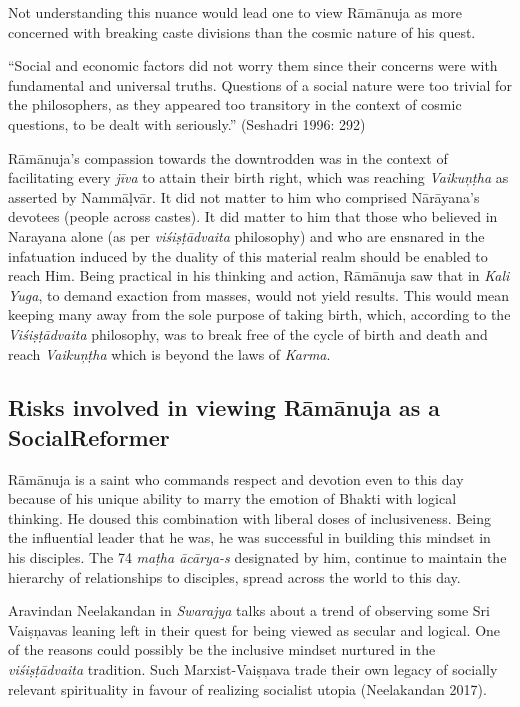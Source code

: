 Not understanding this nuance would lead one to view Rāmānuja as more concerned with breaking caste divisions than the cosmic nature of his quest.

\newpage

“Social and economic factors did not worry them since their concerns were with fundamental and universal truths. Questions of a social nature were too trivial for the philosophers, as they appeared too transitory in the context of cosmic questions, to be dealt with seriously.” (Seshadri 1996: 292)

Rāmānuja’s compassion towards the downtrodden was in the context of facilitating every \textit{jīva} to attain their birth right, which was reaching \textit{Vaikuņṭha} as asserted by Nammāḷvār. It did not matter to him who comprised Nārāyana’s devotees (people across castes). It did matter to him that those who believed in Narayana alone (as per \textit{viśiṣṭādvaita} philosophy) and who are ensnared in the infatuation induced by the duality of this material realm should be enabled to reach Him. Being practical in his thinking and action, Rāmānuja saw that in \textit{Kali Yuga}, to demand exaction from masses, would not yield results. This would mean keeping many away from the sole purpose of taking birth, which, according to the \textit{Viśiṣṭādvaita} philosophy, was to break free of the cycle of birth and death and reach \textit{Vaikuņṭha }which is beyond the laws of \textit{Karma}.


\subsection*{Risks involved in viewing Rāmānuja as a Social\hfill \break Reformer}

Rāmānuja is a saint who commands respect and devotion even to this day because of his unique ability to marry the emotion of Bhakti with logical thinking. He doused this combination with liberal doses of inclusiveness. Being the influential leader that he was, he was successful in building this mindset in his disciples. The 74 \textit{maṭha ācārya-s} designated by him, continue to maintain the hierarchy of relationships to disciples, spread across the world to this day.

\vskip 4pt

Aravindan Neelakandan in \textit{Swarajya} talks about a trend of observing some Sri Vaiṣņavas leaning left in their quest for being viewed as secular and logical. One of the reasons could possibly be the inclusive mindset nurtured in the \textit{viśiṣṭādvaita} tradition. Such Marxist-Vaiṣņava trade their own legacy of socially relevant spirituality in favour of realizing socialist utopia (Neelakandan 2017).

